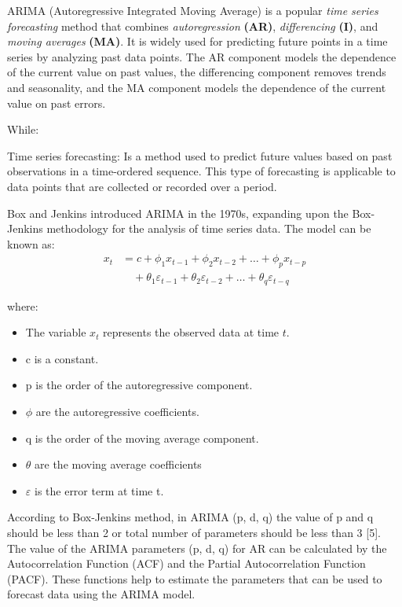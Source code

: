 \documentclass{ieeeojies}
\begin{document}
\hspace{0.3cm} ARIMA (Autoregressive Integrated Moving Average) is a popular \textit{time series forecasting} method that combines \textit{autoregression} \textbf{(AR)}, \textit{differencing} \textbf{(I)}, and \textit{moving averages} \textbf{(MA)}. It is widely used for predicting future points in a time series by analyzing past data points. The AR component models the dependence of the current value on past values, the differencing component removes trends and seasonality, and the MA component models the dependence of the current value on past errors.

 While:

Time series forecasting: Is a method used to predict future values based on past observations in a time-ordered sequence. This type of forecasting is applicable to data points that are collected or recorded over a period.

Box and Jenkins introduced ARIMA in the 1970s, expanding upon the Box-Jenkins methodology for the analysis of time series data. The model can be known as:
\begin{align*}
    x_t & = c + \phi_1 x_{t-1} + \phi_2 x_{t-2} + \ldots + \phi_p x_{t-p} \\
        & \quad + \theta_1 \varepsilon_{t-1} + \theta_2 \varepsilon_{t-2} + \ldots + \theta_q \varepsilon_{t-q}
\end{align*}

where:
\begin{itemize}
    \item The variable \(x_t\) represents the observed data at time \(t\).
    \item c is a constant.
    \item p is the order of the autoregressive component.
    \item \(\phi\) are the autoregressive coefficients.
    \item q is the order of the moving average component.
    \item \( \theta \) are the moving average coefficients
    \item $\varepsilon$ is the error term at time t.
\end{itemize}

\hspace{0.3cm}According to Box-Jenkins method, in ARIMA (p, d, q) the value of p and q should be less than 2 or total number of parameters should be less than 3 [5]. The value of the ARIMA parameters (p, d, q) for AR can be calculated by the Autocorrelation Function (ACF) and the Partial Autocorrelation Function (PACF). These functions help to estimate the parameters that can be used to forecast data using the ARIMA model.
\end{document}
